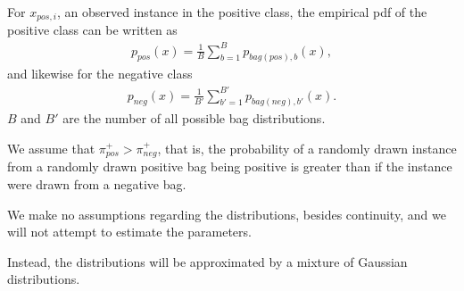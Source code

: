 
For $x_{pos,i}$, an observed instance in the positive class, the empirical pdf of the positive class can be written as
\begin{align}
  p_{pos}(x) = \frac{1}{B}\sum_{b = 1}^B  p_{bag(pos),b}(x), 
\end{align}
and likewise for the negative class
\begin{align}
  p_{neg}(x) = \frac{1}{B'}\sum_{b' = 1}^{B'}  p_{bag(neg),{b'}}(x). 
\end{align}
$B$ and $B'$ are the number of all possible bag distributions. 

We assume that $\pi_{pos}^+ > \pi_{neg}^+$, that is, the probability of a randomly drawn instance from a randomly drawn positive bag being positive is greater than if the instance were drawn from a negative bag. 

We make no assumptions regarding the distributions, besides continuity, and we will not attempt to estimate the parameters. 

Instead, the distributions will be approximated by a mixture of Gaussian distributions. 